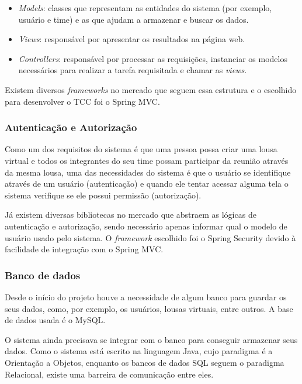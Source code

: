 \begin{itemize}
	\item \textit{Models}: classes que representam as entidades do sistema (por exemplo, usuário e time) e as que ajudam a armazenar e buscar os dados.
	\item \textit{Views}: responsável por apresentar os resultados na página web.
	\item \textit{Controllers}: responsável por processar as requisições, instanciar os modelos necessários para realizar a tarefa requisitada e chamar as \textit{views}.
\end{itemize}

Existem diversos \textit{frameworks} no mercado que seguem essa estrutura e o escolhido para desenvolver o TCC foi o Spring MVC.

\subsubsection*{Autenticação e Autorização}

Como um dos requisitos do sistema é que uma pessoa possa criar uma lousa virtual e todos os integrantes do seu time possam participar da reunião através da mesma lousa, uma das necessidades do sistema é que o usuário se identifique através de um usuário (autenticação) e quando ele tentar acessar alguma tela o sistema verifique se ele possui permissão (autorização).

Já existem diversas bibliotecas no mercado que abstraem as lógicas de autenticação e autorização, sendo necessário apenas informar qual o modelo de usuário usado pelo sistema. O \textit{framework} escolhido foi o Spring Security devido à facilidade de integração com o Spring MVC.

\subsubsection*{Banco de dados}

Desde o início do projeto houve a necessidade de algum banco para guardar os seus dados, como, por exemplo, os usuários, lousas virtuais, entre outros. A base de dados usada é o MySQL.


O sistema ainda precisava se integrar com o banco para conseguir armazenar seus dados. Como o sistema  está escrito na linguagem Java, cujo paradigma é a Orientação a Objetos, enquanto os bancos de dados SQL seguem o paradigma Relacional, existe uma barreira de comunicação entre eles.


